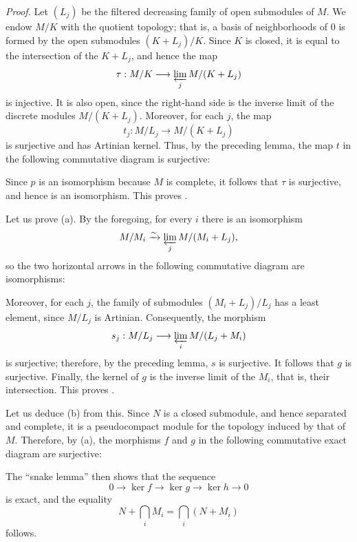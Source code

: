
\medskip
\noindent\textit{Proof.}
\label{sga3:VIIB:0.2.D-proof}
Let \((L_j)\) be the filtered decreasing family of open submodules of
\(M\). We endow \(M/K\) with the quotient topology; that is, a basis
of neighborhoods of \(0\) is formed by the open submodules
\((K+L_j)/K\). Since \(K\) is closed, it is equal to the intersection
of the \(K+L_j\), and hence the map
\[
  \tau:M/K\longrightarrow\varprojlim_j M/(K+L_j)
\]
is injective. It is also open, since the right-hand side is the
inverse limit of the discrete modules \(M/(K+L_j)\). Moreover, for
each \(j\), the map
\[
  t_j:M/L_j\longrightarrow M/(K+L_j)
\]
is surjective and has Artinian kernel. Thus, by the preceding lemma,
the map \(t\) in the following commutative diagram is surjective:
\begin{center}
  \label{sga3:VIIB:0.2.D-quotient-completion-square}
  
\end{center}
Since \(p\) is an isomorphism because \(M\) is complete, it follows
that \(\tau\) is surjective, and hence is an isomorphism. This proves
\textup{}.

\label{sga3:VIIB:0.2.D-proof-ii-a}
Let us prove \textup{(a)}. By the foregoing, for every \(i\) there
is an isomorphism
\[
  M/M_i\xrightarrow{\sim}\varprojlim_j M/(M_i+L_j),
\]
so the two horizontal arrows in the following commutative diagram are
isomorphisms:
\begin{center}
  \label{sga3:VIIB:0.2.D-filtered-family-square}
  
\end{center}
Moreover, for each \(j\), the family of submodules
\((M_i+L_j)/L_j\) has a least element, since \(M/L_j\) is Artinian.
Consequently, the morphism
\[
  s_j:M/L_j\longrightarrow\varprojlim_i M/(L_j+M_i)
\]
is surjective; therefore, by the preceding lemma, \(s\) is
surjective. It follows that \(g\) is surjective. Finally, the kernel
of \(g\) is the inverse limit of the \(M_i\), that is, their
intersection. This proves \textup{}.

\label{sga3:VIIB:0.2.D-proof-ii-b}
Let us deduce \textup{(b)} from this. Since \(N\) is a closed
submodule, and hence separated and complete, it is a pseudocompact
module for the topology induced by that of \(M\). Therefore, by
\textup{(a)}, the morphisms \(f\) and \(g\) in the following
commutative exact diagram are surjective:
\begin{center}
  \label{sga3:VIIB:0.2.D-snake-exact-diagram}
  
\end{center}
The ``snake lemma'' then shows that the sequence
\[
  0\longrightarrow\ker f\longrightarrow\ker g
  \longrightarrow\ker h\longrightarrow 0
\]
is exact, and the equality
\[
  N+\bigcap_i M_i=\bigcap_i(N+M_i)
\]
follows.

